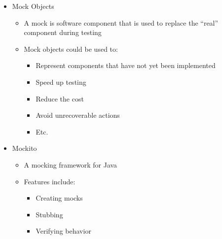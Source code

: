 \begin{itemize}
		\item Mock Objects
		\begin{itemize}
			\item A mock is software component that is used to replace the “real” component during testing
			\item Mock objects could be used to:
			\begin{itemize}
				\item Represent components that have not yet been implemented
				\item Speed up testing
				\item Reduce the cost
				\item Avoid unrecoverable actions
				\item Etc.
			\end{itemize}
		\end{itemize}

		\item Mockito
		\begin{itemize}
			\item A mocking framework for Java
			\item Features include:
			\begin{itemize}
				\item Creating mocks
				\item Stubbing
				\item Verifying behavior
			\end{itemize}
		\end{itemize}
	\end{itemize}

%